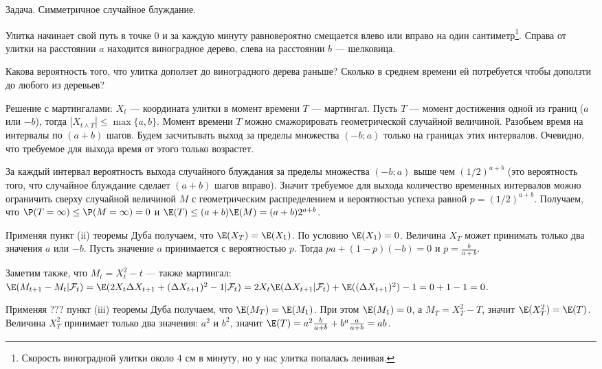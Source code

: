 

Задача. Симметричное случайное блуждание.

Улитка начинает свой путь в точке 0 и за каждую минуту равновероятно смещается влево или вправо на один сантиметр\footnote{Скорость виноградной улитки около 4 см в минуту, но у нас улитка попалась ленивая.}. Справа от улитки на расстоянии $a$ находится виноградное дерево, слева на расстоянии $b$ --- шелковица.

Какова вероятность того, что улитка доползет до виноградного дерева раньше? Сколько в среднем времени ей потребуется чтобы доползти до любого из деревьев?

Решение с мартингалами: $X_{t}$ --- координата улитки в момент времени $T$ --- мартингал. Пусть $T$ --- момент достижения одной из границ ($a$ или $-b$), тогда $|X_{t\wedge T}|\leq \max\{a,b\}$. Момент времени $T$ можно смажорировать геометрической случайной величиной. Разобьем время на интервалы по $(a+b)$ шагов. Будем засчитывать выход за пределы множества $(-b;a)$ только на границах этих интервалов. Очевидно, что требуемое для выхода время от этого только возрастет. 

За каждый интервал вероятность выхода случайного блуждания за пределы множества $(-b;a)$ выше чем $(1/2)^{a+b}$ (это вероятность того, что случайное блуждание сделает $(a+b)$ шагов вправо). Значит требуемое для выхода количество временных интервалов можно ограничить сверху случайной величиной $M$ с геометрическим распределением и вероятностью успеха равной $p=(1/2)^{a+b}$. Получаем, что $\P(T=\infty)\leq \P(M=\infty)=0$ и $\E(T)\leq (a+b) \E(M)=(a+b) 2^{a+b}$.

Применяя пункт (ii) теоремы Дуба получаем, что $\E(X_{T})=\E(X_{1})$. По условию $\E(X_{1})=0$. Величина $X_{T}$ может принимать только два значения $a$ или $-b$. Пусть значение $a$ принимается с вероятностью $p$. Тогда $pa+(1-p)(-b)=0$ и $p=\frac{b}{a+b}$.

Заметим также, что $M_{t}=X^{2}_{t}-t$ --- также мартингал: $\E(M_{t+1}-M_{t}|\mathcal{F}_{t})=\E(2X_{t}\Delta X_{t+1}+(\Delta X_{t+1})^{2}-1|\mathcal{F}_{t})=2X_{t}\E(\Delta X_{t+1}|\mathcal{F}_{t})+\E((\Delta X_{t+1})^{2})-1=0+1-1=0$. 

Применяя ??? пункт (iii) теоремы Дуба получаем, что $\E(M_{T})=\E(M_{1})$. При этом $\E(M_{1})=0$, а $M_{T}=X_{T}^{2}-T$, значит $\E(X_{T}^{2})=\E(T)$. Величина $X_{T}^{2}$ принимает только два значения: $a^{2}$ и $b^{2}$, значит $\E(T)=a^{2}\frac{b}{a+b}+b^{a}\frac{a}{a+b}=ab$.

